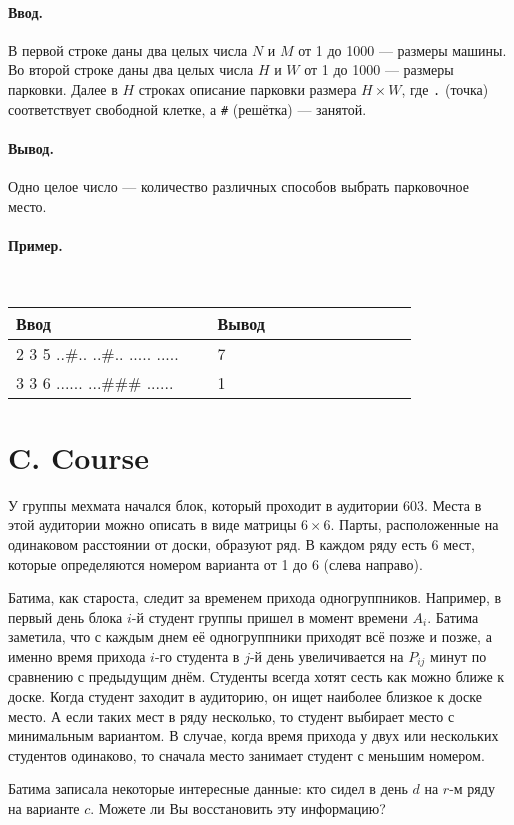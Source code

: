 \documentclass[12pt, a5paper]{article}
\newcommand{\informat}[1]
{
	\paragraph{Ввод.\\} #1
}
\newcommand{\outformat}[1]
{
	\paragraph{Вывод.\\} #1
}
\newcommand{\examplee}[4]
{
	\paragraph{Пример.\\}
	{\tt
	\begin{tabular}{|p{0.4\linewidth}|p{0.4\linewidth}|}
	\hline
	Ввод 	& Вывод  	\\
	\hline
	#1 		& #2 		\\
	\hline
	#3		& #4		\\
	\hline
	\end{tabular}
	}
}
\begin{document}
\informat{В первой строке даны два целых числа $N$ и $M$ от 1 до 1000 --- размеры машины. \newline 
Во второй строке даны два целых числа $H$ и $W$ от 1 до 1000 --- размеры парковки.\newline 
Далее в $H$ строках описание парковки размера $H \times W$, где {\tt .} (точка)  соответствует свободной клетке, а {\tt \#} (решётка) --- занятой.}

\outformat{Одно целое число --- количество различных способов выбрать парковочное место.}

\examplee
{2 3 \newline
4 5 \newline
..\#.. \newline
..\#.. \newline
..... \newline
.....}
{7}
{3 3 \newline
3 6 \newline
...... \newline
...\#\#\# \newline
......}
{1}



\section*{C. Course}


У группы мехмата начался блок, который проходит в аудитории $603$. Места в этой аудитории можно описать в виде матрицы $6 \times 6$. Парты, расположенные на одинаковом расстоянии от доски, образуют ряд. В каждом ряду есть 6 мест, которые определяются номером варианта от 1 до 6 (слева направо).

Батима, как староста, следит за временем прихода одногруппников. Например, в первый день блока $i$-й студент группы пришел в момент времени $A_i$. Батима заметила, что с каждым днем её одногруппники приходят всё позже и позже, а именно время прихода $i$-го студента в $j$-й день увеличивается на $P_{ij}$ минут по сравнению с предыдущим днём. Студенты всегда хотят сесть как можно ближе к доске. Когда студент заходит в аудиторию, он ищет наиболее близкое к доске место. А если таких мест в ряду несколько, то студент выбирает место с минимальным вариантом. В случае, когда время прихода у двух или нескольких студентов одинаково, то сначала место занимает студент с меньшим номером. 

Батима записала некоторые интересные данные: кто сидел в день $d$ на $r$-м ряду на варианте $c$. Можете ли Вы восстановить эту информацию?
\end{document}
